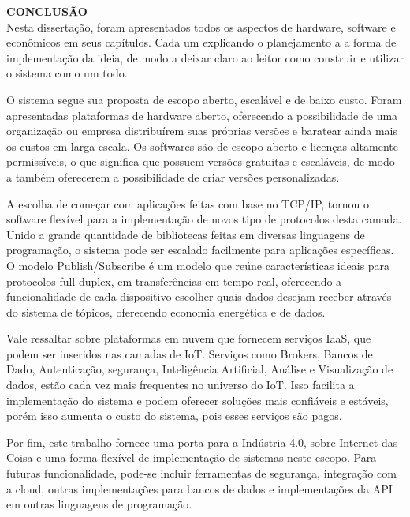 \noindent\textbf{CONCLUSÃO}
$\!$\\


Nesta dissertação, foram apresentados todos os aspectos de hardware, software e econômicos em seus capítulos. Cada um explicando o planejamento a a forma de implementação da ideia, de modo a deixar claro ao leitor como construir e utilizar o sistema como um todo.

O sistema segue sua proposta de escopo aberto, escalável e de baixo custo. Foram apresentadas plataformas de hardware aberto, oferecendo a possibilidade de uma organização ou empresa distribuírem suas próprias versões e baratear ainda mais os custos em larga escala. Os softwares são de escopo aberto e licenças altamente permissíveis, o que significa que possuem versões gratuitas e escaláveis, de modo a também oferecerem a possibilidade de criar versões personalizadas.

A escolha de começar com aplicações feitas com base no TCP/IP, tornou o software flexível para a implementação de novos tipo de protocolos desta camada. Unido a grande quantidade de bibliotecas feitas em diversas linguagens de programação, o sistema pode ser escalado facilmente para aplicações específicas. O modelo Publish/Subscribe é um modelo que reúne características ideais para protocolos full-duplex, em transferências em tempo real, oferecendo a funcionalidade de cada dispositivo escolher quais dados desejam receber através do sistema de tópicos, oferecendo economia energética e de dados.

Vale ressaltar sobre plataformas em nuvem que fornecem serviços IaaS, que podem ser inseridos nas camadas de IoT. Serviços como Brokers, Bancos de Dado, Autenticação, segurança, Inteligência Artificial, Análise e Visualização de dados, estão cada vez mais frequentes no universo do IoT. Isso facilita a implementação do sistema e podem oferecer soluções mais confiáveis e estáveis, porém isso aumenta o custo do sistema, pois esses serviços são pagos.

Por fim, este trabalho fornece uma porta para a Indústria 4.0, sobre Internet das Coisa e uma forma flexível de implementação de sistemas neste escopo. Para futuras funcionalidade, pode-se incluir ferramentas de segurança, integração com a cloud, outras implementações para bancos de dados e implementações da API em outras linguagens de programação.

\pagebreak



